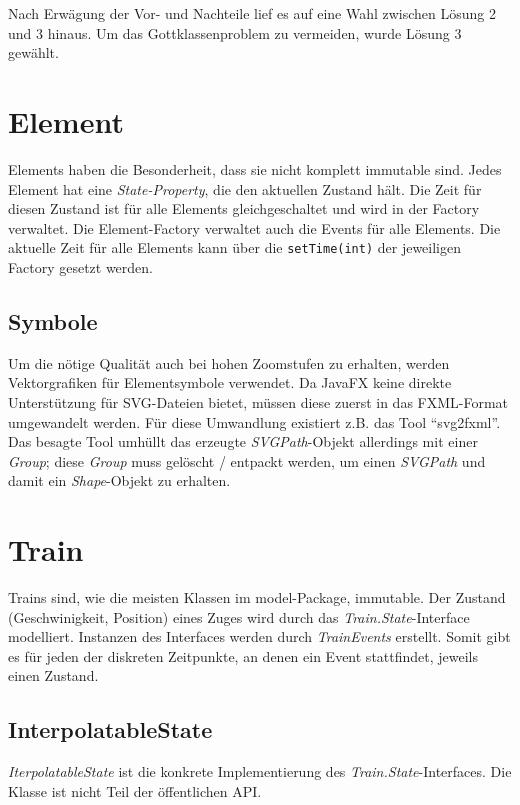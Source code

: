 \documentclass[accentcolor=tud0b,12pt,paper=a4]{tudreport}
\begin{document}
			Nach Erwägung der Vor- und Nachteile lief es auf eine Wahl zwischen Lösung 2 und 3 hinaus. Um das Gottklassenproblem zu vermeiden, wurde Lösung 3 gewählt.
				
	\section{Element}
		Elements haben die Besonderheit, dass sie nicht komplett immutable sind. Jedes Element hat eine \textit{State-Property}, die den aktuellen Zustand hält. Die Zeit für diesen Zustand ist für alle Elements gleichgeschaltet und wird in der Factory verwaltet. Die Element-Factory verwaltet auch die Events für alle Elements. Die aktuelle Zeit für alle Elements kann über die \texttt{setTime(int)} der jeweiligen Factory gesetzt werden.\\
		
		\subsection{Symbole}
			Um die nötige Qualität auch bei hohen Zoomstufen zu erhalten, werden Vektorgrafiken für Elementsymbole verwendet. Da JavaFX keine direkte Unterstützung für SVG-Dateien bietet, müssen diese zuerst in das FXML-Format umgewandelt werden. Für diese Umwandlung existiert z.B. das Tool "`svg2fxml"'.
			Das besagte Tool umhüllt das erzeugte \textit{SVGPath}-Objekt allerdings mit einer \textit{Group}; diese \textit{Group} muss gelöscht / entpackt werden, um einen \textit{SVGPath} und damit ein \textit{Shape}-Objekt zu erhalten.
		
	\section{Train}
	\label{train}
		Trains sind, wie die meisten Klassen im model-Package, immutable. Der Zustand (Geschwinigkeit, Position) eines Zuges wird durch das \textit{Train.State}-Interface modelliert. Instanzen des Interfaces werden durch \textit{TrainEvents} erstellt. Somit gibt es für jeden der diskreten Zeitpunkte, an denen ein Event stattfindet, jeweils einen Zustand.
		
		\subsection{InterpolatableState}
			\textit{IterpolatableState} ist die konkrete Implementierung des \textit{Train.State}-Interfaces.
			Die Klasse ist nicht Teil der öffentlichen API.\\
			
\end{document}

